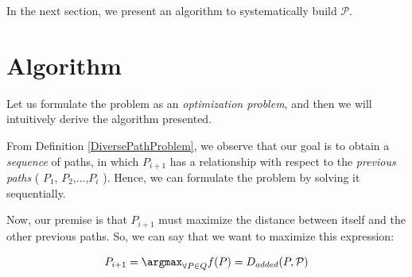\documentclass[graybox]{svmult}
\newcommand{\PathSet}{\ensuremath{\mathcal P} }
\newcommand{\Path}{\ensuremath{P} }
\newcommand{\AddedDistance}{\ensuremath{D_{added}} }
\begin{document}
In the next section, we present an algorithm to systematically build $\PathSet$.

\section{Algorithm}
Let us formulate the problem as an \emph{optimization problem}, and then we will intuitively derive the algorithm presented.

From Definition \ref{DiversePathProblem}, we observe that our goal is to obtain a \emph{sequence} of paths, in which $\Path_{i+1}$ has a relationship with respect to the \emph{previous paths} ( $\Path_{1}$, $\Path_{2}$,...,$\Path_{i}$ ). Hence, we can formulate the problem by solving it sequentially.
\medskip

Now, our premise is that $\Path_{i+1}$ must maximize the distance between itself and the other previous paths. So, we can say that we want to maximize this expression:

\[ \Path_{i+1} = \argmax _{\forall \Path \in Q} f(\Path) = \AddedDistance (\Path, \PathSet) \]

\begin{algorithm}

\end{algorithm}



\end{document}
